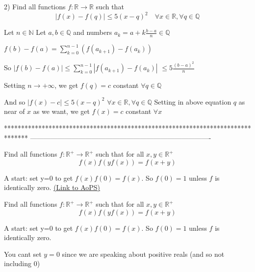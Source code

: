 \begin{solution}
	\begin{tcolorbox}2) Find all functions $f:\mathbb{R}\to\mathbb{R}$ such that 
\[ \left | f(x)-f(q) \right |\leq 5(x-q)^2 \quad  \forall x\in\mathbb{R}, \forall q\in\mathbb{Q} \]\end{tcolorbox}
Let $n\in\mathbb N$
Let $a,b\in\mathbb Q$ and numbers $a_k=a+k\frac{b-a}n\in\mathbb Q$

$f(b)-f(a)=\sum_{k=0}^{n-1}(f(a_{k+1})-f(a_k))$

So $|f(b)-f(a)|\le \sum_{k=0}^{n-1}|f(a_{k+1})-f(a_k)|$ $\le 5\frac{(b-a)^2}n$

Setting $n\to+\infty$, we get $f(q)=c$ constant $\forall q\in\mathbb Q$

And so $|f(x)-c|\le 5(x-q)^2$ $\forall x\in\mathbb R,\forall q\in\mathbb Q$
Setting in above equation $q$ as near of $x$ as we want, we get $\boxed{f(x)=c}$ constant $\forall x$
\end{solution}
*******************************************************************************
-------------------------------------------------------------------------------

\begin{problem}
	Find all functions $f:\mathbb{R}^+\to \mathbb{R}^+$ such that for all $x,y\in\mathbb{R}^+$\[f(x)f(yf(x))=f(x+y)\]

A start: set y=0 to get $f(x)f(0)=f(x)$. So $f(0)=1$ unless $f$ is identically zero.
	\flushright \href{https://artofproblemsolving.com/community/c6h562698}{(Link to AoPS)}
\end{problem}



\begin{solution}
	\begin{tcolorbox}Find all functions $f:\mathbb{R}^+\to \mathbb{R}^+$ such that for all $x,y\in\mathbb{R}^+$\[f(x)f(yf(x))=f(x+y)\]

A start: set y=0 to get $f(x)f(0)=f(x)$. So $f(0)=1$ unless $f$ is identically zero.\end{tcolorbox}
You cant set $y=0$ since we are speaking about positive reals (and so not including $0$)
\end{solution}



